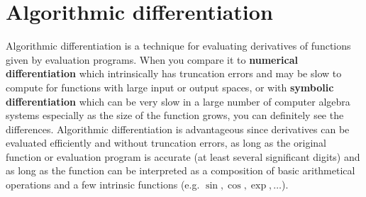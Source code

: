 \documentclass[12pt, a4paper]{article}
\begin{document}
\section{Algorithmic differentiation} \label{section:AD}
Algorithmic differentiation is a technique for evaluating derivatives of functions given by evaluation programs. When you compare it to \textbf{numerical differentiation} which intrinsically has truncation errors and may be slow to compute for functions with large input or output spaces, or with \textbf{symbolic differentiation} which can be very slow in a large number of computer algebra systems especially as the size of the function grows, you can definitely see the differences. Algorithmic differentiation is advantageous since derivatives can be evaluated efficiently and without truncation errors, as long as the original function or evaluation program is accurate (at least several significant digits) and as long as the function can be interpreted as a composition of basic arithmetical operations and a few intrinsic functions (e.g. $\sin, \cos, \exp, \ldots$).\par
\end{document}

